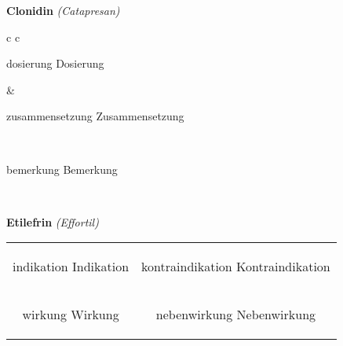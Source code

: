 \documentclass[12pt]{beamer}
\begin{document}
\begin{frame}{
    \textbf{Clonidin}
    \textit{(Catapresan)}
}
    \begin{tabular}{c c}
        \begin{beamercolorbox}[wd=\boxwidth\textwidth,ht=\boxheight\textheight,sep=1em]{dosierung}
        Dosierung
        \end{beamercolorbox} & 
        \begin{beamercolorbox}[wd=\boxwidth\textwidth,ht=\boxheight\textheight,sep=1em]{zusammensetzung}
        Zusammensetzung
        \end{beamercolorbox} \\
        \begin{beamercolorbox}[wd=\textwidth,ht=\boxheight\textheight,sep=1em]{bemerkung}
        Bemerkung
        \end{beamercolorbox} \\
    \end{tabular}
\end{frame}

\begin{frame}{
    \textbf{Etilefrin}
    \textit{(Effortil)}
}
    \begin{tabular}{c c}
        \begin{beamercolorbox}[wd=\boxwidth\textwidth,ht=\boxheight\textheight,sep=1em]{indikation}
        Indikation
        \end{beamercolorbox} & 
        \begin{beamercolorbox}[wd=\boxwidth\textwidth,ht=\boxheight\textheight,sep=1em]{kontraindikation}
        Kontraindikation 
        \end{beamercolorbox} \\
        \begin{beamercolorbox}[wd=\boxwidth\textwidth,ht=\boxheight\textheight,sep=1em]{wirkung}
        Wirkung
        \end{beamercolorbox} & 
        \begin{beamercolorbox}[wd=\boxwidth\textwidth,ht=\boxheight\textheight,sep=1em]{nebenwirkung}
        Nebenwirkung
        \end{beamercolorbox} \\
    \end{tabular}
\end{frame}
\end{document}
